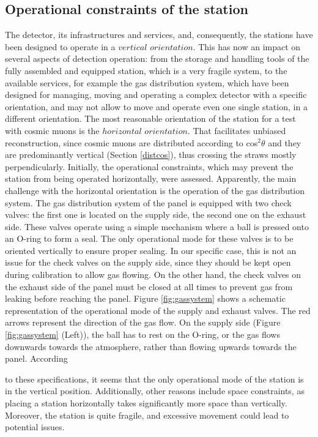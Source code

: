 \subsection{Operational constraints of the station}\label{gassystem}
The detector, its infrastructures 
and services, and, consequently, the stations have been
designed to operate in a 
$vertical$ $orientation$. This has now an impact 
on several aspects of detection operation: from 
the storage and handling tools of the fully assembled and 
equipped station, which is a very fragile system, to
the available services, for example the gas 
distribution system, which have been designed for
managing, moving and operating a complex 
detector with a specific orientation, and may not
allow to move and operate even one single 
station, in a different orientation. 
The most reasonable orientation of the station for a test with
cosmic muons is the $horizontal$ $orientation$. 
That facilitates unbiased 
reconstruction, since cosmic muons are distributed according to 
cos$^2\theta$ and they are predominantly vertical 
(Section \ref{distcos}), thus crossing the straws mostly perpendicularly.
Initially, the operational constraints, which may prevent the station from being operated horizontally, were assessed.
Apparently, the main challenge with the horizontal orientation is the operation of the gas
distribution system. The gas distribution system of the panel is equipped with two check valves:
the first one is located on the supply side, the second one on the exhaust side. These valves
operate using a simple mechanism where a ball is pressed onto an O-ring to form a seal. The
only operational mode for these valves is to be oriented vertically to ensure proper sealing. In
our specific case, this is not an issue for the check valves on the supply side, since they should
be kept open during calibration to allow gas flowing. On the other hand, the check valves on
the exhaust side of the panel must be closed at all times to prevent gas from leaking before
reaching the panel. Figure \ref{fig:gassystem} shows a schematic 
representation of the operational mode of the supply 
and exhaust valves. The red arrows represent the 
direction of the gas flow. On the supply side (Figure 
\ref{fig:gassystem} (Left)), the ball has to rest on the 
O-ring, or the gas flows downwards towards the atmosphere, 
rather than flowing upwards towards the panel. According

to these specifications, it seems that the only operational 
mode of the station is in the vertical position. 
Additionally, other reasons include space constraints, as placing 
a station horizontally takes significantly more space than 
vertically. Moreover, the station is quite fragile, and 
excessive movement could lead to potential issues.

